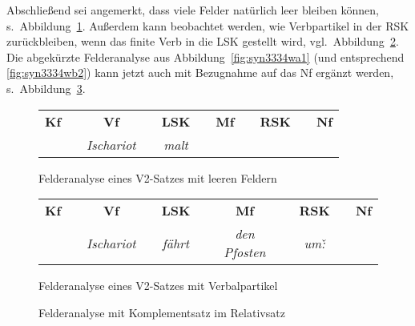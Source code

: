 Abschließend sei angemerkt, dass viele Felder natürlich leer bleiben können, s.\ Abbildung~\ref{fig:leerefelder}.
Außerdem kann beobachtet werden, wie Verbpartikel in der RSK zurückbleiben, wenn das finite Verb in die LSK gestellt wird, vgl.\ Abbildung~\ref{fig:verbalpartikelalleinzuhaus}.
Die abgekürzte Felderanalyse aus Abbildung~\ref{fig:syn3334wa1} (und entsprechend \ref{fig:syn3334wb2}) kann jetzt auch mit Bezugnahme auf das Nf ergänzt werden, s.\ Abbildung~\ref{fig:syn3334wa1w}.

\begin{figure}[!h]
  \centering
  \begin{tabular}{cp{0.1em}cp{0.1em}cp{0.1em}cp{0.1em}cp{0.1em}c}
    \textbf{Kf} && \textbf{Vf} && \textbf{LSK} && \textbf{Mf} && \textbf{RSK} && \textbf{Nf} \\
    \cmidrule{1-1}\cmidrule{3-3}\cmidrule{5-5}\cmidrule{7-7}\cmidrule{9-9}
    && \textit{Ischariot} && \textit{malt} &&&&&& \\
  \end{tabular}
  \caption{Felderanalyse eines V2-Satzes mit leeren Feldern}
  \label{fig:leerefelder}
\end{figure}

\begin{figure}[!h]
  \centering
  \begin{tabular}{cp{0.1em}cp{0.1em}cp{0.1em}cp{0.1em}cp{0.1em}c}
    \textbf{Kf} && \textbf{Vf} && \textbf{LSK} && \textbf{Mf} && \textbf{RSK} && \textbf{Nf} \\
    \cmidrule{1-1}\cmidrule{3-3}\cmidrule{5-5}\cmidrule{7-7}\cmidrule{9-9}\cmidrule{11-11}
    && \textit{Ischariot} && \textit{fährt} && \textit{den Pfosten} && \textit{um\v:} & \\
  \end{tabular}
  \caption{Felderanalyse eines V2-Satzes mit Verbalpartikel}
  \label{fig:verbalpartikelalleinzuhaus}
\end{figure}

\begin{figure}[!h]
  \centering
  \caption{Felderanalyse mit Komplementsatz im Relativsatz}
  \label{fig:syn3334wa1w}
\end{figure}

